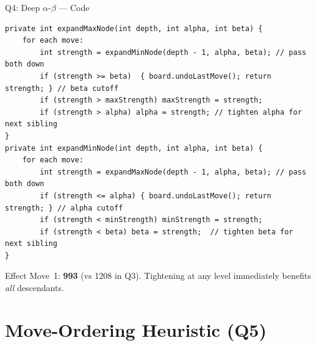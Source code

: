 \documentclass[aspectratio=1610]{beamer}
\begin{document}
\begin{frame}[fragile]{Q4: Deep $\alpha$-$\beta$ --- Code}
  \begin{lstlisting}
private int expandMaxNode(int depth, int alpha, int beta) {
    for each move:
        int strength = expandMinNode(depth - 1, alpha, beta); // pass both down
        if (strength >= beta)  { board.undoLastMove(); return strength; } // beta cutoff
        if (strength > maxStrength) maxStrength = strength;
        if (strength > alpha) alpha = strength; // tighten alpha for next sibling
}
private int expandMinNode(int depth, int alpha, int beta) {
    for each move:
        int strength = expandMaxNode(depth - 1, alpha, beta); // pass both down
        if (strength <= alpha) { board.undoLastMove(); return strength; } // alpha cutoff
        if (strength < minStrength) minStrength = strength;
        if (strength < beta) beta = strength;  // tighten beta for next sibling
}
  \end{lstlisting}
  \begin{exampleblock}{Effect}
    Move~1: \textbf{993} (vs 1208 in Q3).
    Tightening at any level immediately benefits \emph{all} descendants.
  \end{exampleblock}
\end{frame}

\section{Move-Ordering Heuristic (Q5)}
\end{document}
